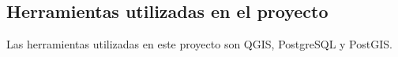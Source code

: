 
\subsection{Herramientas utilizadas en el proyecto}

Las herramientas utilizadas en este proyecto son QGIS, PostgreSQL y PostGIS.

